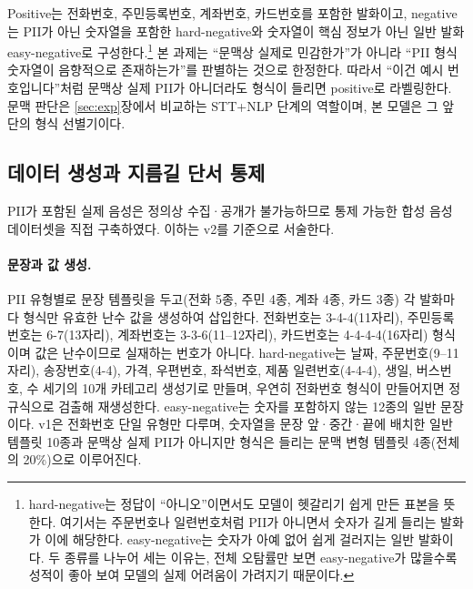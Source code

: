 \documentclass[10pt,twocolumn]{article}
\begin{document}
Positive는 전화번호, 주민등록번호, 계좌번호, 카드번호를 포함한 발화이고, negative는 PII가
아닌 숫자열을 포함한 hard-negative와 숫자열이 핵심 정보가 아닌 일반 발화
easy-negative로 구성한다.\footnote{hard-negative는 정답이 ``아니오''이면서도 모델이 헷갈리기
쉽게 만든 표본을 뜻한다. 여기서는 주문번호나 일련번호처럼 PII가 아니면서 숫자가 길게 들리는
발화가 이에 해당한다. easy-negative는 숫자가 아예 없어 쉽게 걸러지는 일반 발화이다. 두 종류를
나누어 세는 이유는, 전체 오탐률만 보면 easy-negative가 많을수록 성적이 좋아 보여 모델의 실제
어려움이 가려지기 때문이다.} 본 과제는 ``문맥상 실제로 민감한가''가 아니라 ``PII 형식 숫자열이 음향적으로
존재하는가''를 판별하는 것으로 한정한다. 따라서 ``이건 예시 번호입니다''처럼 문맥상 실제
PII가 아니더라도 형식이 들리면 positive로 라벨링한다. 문맥 판단은 \ref{sec:exp}장에서
비교하는 STT+NLP 단계의 역할이며, 본 모델은 그 앞단의 형식 선별기이다.

\subsection{데이터 생성과 지름길 단서 통제}\label{sec:data:gen}
PII가 포함된 실제 음성은 정의상 수집·공개가 불가능하므로 통제 가능한 합성 음성 데이터셋을
직접 구축하였다. 이하는 v2를 기준으로 서술한다.

\paragraph{문장과 값 생성.}
PII 유형별로 문장 템플릿을 두고(전화 5종, 주민 4종, 계좌 4종, 카드 3종) 각 발화마다 형식만
유효한 난수 값을 생성하여 삽입한다. 전화번호는 3-4-4(11자리), 주민등록번호는 6-7(13자리),
계좌번호는 3-3-6(11--12자리), 카드번호는 4-4-4-4(16자리) 형식이며 값은 난수이므로 실재하는
번호가 아니다. hard-negative는 날짜, 주문번호(9--11자리), 송장번호(4-4), 가격, 우편번호,
좌석번호, 제품 일련번호(4-4-4), 생일, 버스번호, 수 세기의 10개 카테고리 생성기로 만들며,
우연히 전화번호 형식이 만들어지면 정규식으로 검출해 재생성한다. easy-negative는 숫자를
포함하지 않는 12종의 일반 문장이다. v1은 전화번호 단일 유형만 다루며, 숫자열을 문장
앞·중간·끝에 배치한 일반 템플릿 10종과 문맥상 실제 PII가 아니지만 형식은 들리는 문맥 변형
템플릿 4종(전체의 20\%)으로 이루어진다.
\end{document}
